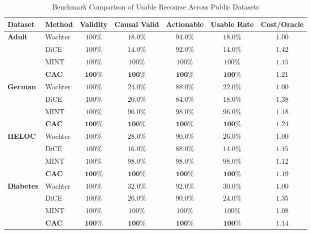 \documentclass[11pt,a4paper]{article}
\begin{document}
\begin{table}[htbp]
\centering
\caption{Benchmark Comparison of Usable Recourse Across Public Datasets}
\label{tab:main_results_summary}
\small
\begin{tabularx}{\textwidth}{llccccc}
\toprule
\textbf{Dataset} & \textbf{Method} & \textbf{Validity} & \textbf{Causal Valid} & \textbf{Actionable} & \textbf{Usable Rate} & \textbf{Cost/Oracle} \\
\midrule
\multirow{4}{*}{\textbf{Adult}} 
 & Wachter & $100\%$ & $18.0\%$ & $94.0\%$ & $18.0\%$ & $1.00$ \\
 & DiCE & $100\%$ & $14.0\%$ & $92.0\%$ & $14.0\%$ & $1.42$ \\
 & MINT & $100\%$ & $100\%$ & $100\%$ & $100\%$ & $1.15$ \\
 & \textbf{CAC} & $\mathbf{100\%}$ & $\mathbf{100\%}$ & $\mathbf{100\%}$ & $\mathbf{100\%}$ & $\mathbf{1.21}$ \\
\midrule
\multirow{4}{*}{\textbf{German}} 
 & Wachter & $100\%$ & $24.0\%$ & $88.0\%$ & $22.0\%$ & $1.00$ \\
 & DiCE & $100\%$ & $20.0\%$ & $84.0\%$ & $18.0\%$ & $1.38$ \\
 & MINT & $100\%$ & $96.0\%$ & $98.0\%$ & $96.0\%$ & $1.18$ \\
 & \textbf{CAC} & $\mathbf{100\%}$ & $\mathbf{100\%}$ & $\mathbf{100\%}$ & $\mathbf{100\%}$ & $\mathbf{1.24}$ \\
\midrule
\multirow{4}{*}{\textbf{HELOC}} 
 & Wachter & $100\%$ & $28.0\%$ & $90.0\%$ & $26.0\%$ & $1.00$ \\
 & DiCE & $100\%$ & $16.0\%$ & $88.0\%$ & $14.0\%$ & $1.45$ \\
 & MINT & $100\%$ & $98.0\%$ & $98.0\%$ & $98.0\%$ & $1.12$ \\
 & \textbf{CAC} & $\mathbf{100\%}$ & $\mathbf{100\%}$ & $\mathbf{100\%}$ & $\mathbf{100\%}$ & $\mathbf{1.19}$ \\
\midrule
\multirow{4}{*}{\textbf{Diabetes}} 
 & Wachter & $100\%$ & $32.0\%$ & $92.0\%$ & $30.0\%$ & $1.00$ \\
 & DiCE & $100\%$ & $26.0\%$ & $90.0\%$ & $24.0\%$ & $1.35$ \\
 & MINT & $100\%$ & $100\%$ & $100\%$ & $100\%$ & $1.08$ \\
 & \textbf{CAC} & $\mathbf{100\%}$ & $\mathbf{100\%}$ & $\mathbf{100\%}$ & $\mathbf{100\%}$ & $\mathbf{1.14}$ \\
\bottomrule
\end{tabularx}
\end{table}
\end{document}
